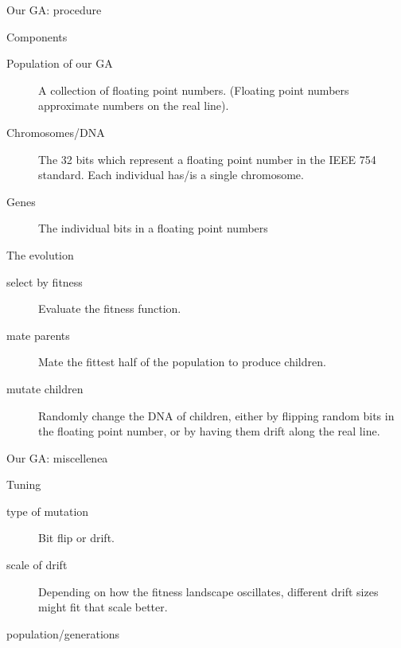 \documentclass[10pt,aspectratio=169]{beamer}
\begin{document}
\begin{frame}{Our GA: procedure}
  \begin{block}{Components}
  \begin{description}
  \item [Population of our GA] A collection of floating
    point numbers.  (Floating point numbers approximate numbers on the
    real line).\\
  \item [Chromosomes/DNA] The 32 bits which represent a
    floating point number in the IEEE 754 standard.  Each individual
    has/is a single chromosome.
  \item [Genes] The individual bits in a floating point numbers
  \end{description}
  \end{block}
  \pause
  \begin{block}{The evolution}
    \begin{description}
      \item [select by fitness] Evaluate the fitness function.
      \item [mate parents] Mate the fittest half of the population to
        produce children.
      \item [mutate children] Randomly change the DNA of children,
        either by flipping random bits in the floating point number,
        or by having them drift along the real line.
    \end{description}
  \end{block}
\end{frame}

\begin{frame}{Our GA: miscellenea}
  \begin{block}{Tuning}
          \begin{description}
          \item [type of mutation] Bit flip or drift.
          \item [scale of drift] Depending on how the fitness landscape
            oscillates, different drift sizes might fit that scale better.
        \item [population/generations]
        \end{description}
  \end{block}
\end{frame}
\end{document}
